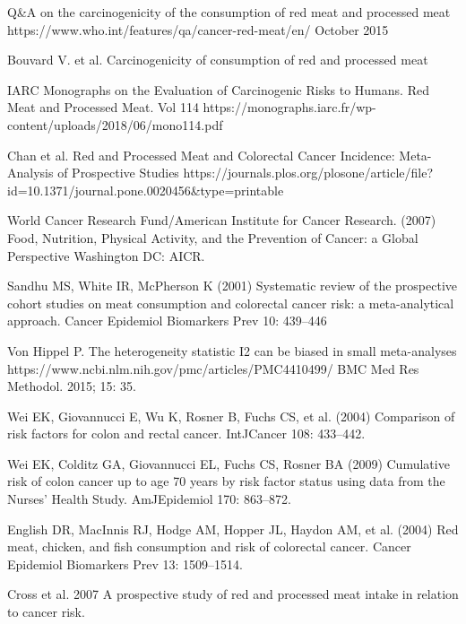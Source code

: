 \documentclass{article}
\begin{document}
\begin{thebibliography}{1}

\newblock Q\&A on the carcinogenicity of the consumption of red meat and processed meat
\newblock https://www.who.int/features/qa/cancer-red-meat/en/
\newblock October 2015

Bouvard V. et al.
\newblock Carcinogenicity of consumption of red and processed meat

IARC Monographs on the Evaluation of Carcinogenic Risks to Humans. Red Meat and Processed Meat. Vol 114
https://monographs.iarc.fr/wp-content/uploads/2018/06/mono114.pdf

Chan et al.
\newblock Red and Processed Meat and Colorectal Cancer Incidence: Meta-Analysis of Prospective Studies
https://journals.plos.org/plosone/article/file?id=10.1371/journal.pone.0020456\&type=printable


World Cancer Research Fund/American Institute for Cancer Research. (2007)
Food, Nutrition, Physical Activity, and the Prevention of Cancer: a Global
Perspective Washington DC: AICR.

Sandhu MS, White IR, McPherson K (2001) Systematic review of the
prospective cohort studies on meat consumption and colorectal cancer risk: a
meta-analytical approach. Cancer Epidemiol Biomarkers Prev 10: 439–446

Von Hippel P.
The heterogeneity statistic I2 can be biased in small meta-analyses
https://www.ncbi.nlm.nih.gov/pmc/articles/PMC4410499/
BMC Med Res Methodol. 2015; 15: 35.

Wei EK, Giovannucci E, Wu K, Rosner B, Fuchs CS, et al. (2004) Comparison
of risk factors for colon and rectal cancer. IntJCancer 108: 433–442.

Wei EK, Colditz GA, Giovannucci EL, Fuchs CS, Rosner BA (2009)
Cumulative risk of colon cancer up to age 70 years by risk factor status using
data from the Nurses’ Health Study. AmJEpidemiol 170: 863–872.

English DR, MacInnis RJ, Hodge AM, Hopper JL, Haydon AM, et al. (2004)
Red meat, chicken, and fish consumption and risk of colorectal cancer. Cancer
Epidemiol Biomarkers Prev 13: 1509–1514.

Cross et al. 2007
A prospective study of red and processed meat intake in relation to cancer risk.

\end{thebibliography}
\end{document}
